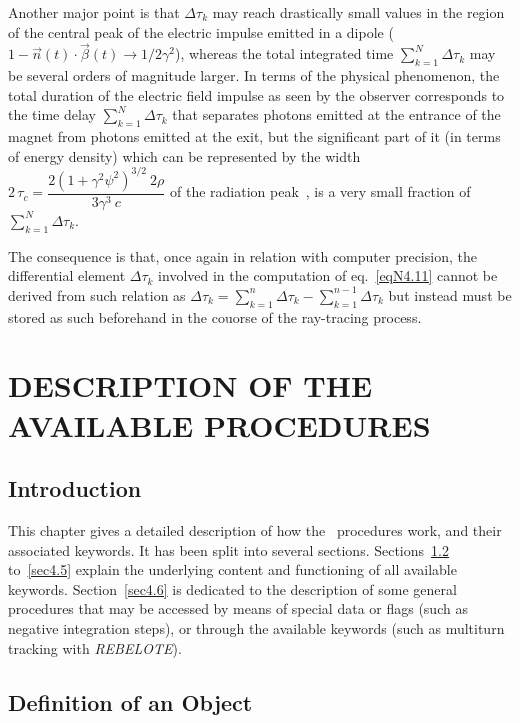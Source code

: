 \noindent Another major point is that  $ \Delta \tau_k$ may reach drastically small values 
in the region of the central peak of the electric impulse emitted in 
a dipole ($1 - \vec{n}(t) \cdot \vec{\beta} (t) \to
1/2\gamma^2$), whereas the total integrated time $\sum_{k=1}^{N} \Delta \tau_k$ may be several
orders of magnitude larger. In terms of the physical phenomenon, the total duration of the electric 
field impulse as seen by the observer corresponds to the time delay $ \sum_{k=1}^{N} \Delta \tau_k$
that separates photons emitted at the
entrance of the magnet from photons emitted at the exit, but the significant  part of it
(in terms of energy density) which can be represented by the width 
$ 2\, \tau_c = \dfrac{2(1 +\gamma^2\psi^2)^{3/2}~2\rho }{ 3\gamma^3~c}$ of the  
radiation peak~\cite{after}, is a very small fraction of $ \sum_{k=1}^{N} \Delta \tau_k$.

\noindent The consequence is that, once again in relation with computer precision, the
differential  element $\Delta \tau_k$ involved in the computation of 
eq.~\ref{eqN4.11} cannot be derived from such relation as 
 $\Delta\tau_k = \sum_{k=1}^{n} \Delta\tau_k - \sum_{k=1}^{n-1} \Delta \tau_k$ 
but instead must be stored as such beforehand in the couorse of the ray-tracing process. 


\clearemptydoublepage

\section{DESCRIPTION OF THE AVAILABLE PROCEDURES} \label{sec4}

\subsection{Introduction} \label{4.1} 


This chapter gives a detailed description of how the \zgou\ 
procedures work, and their associated keywords. It has been 
split into several sections. Sections~\ref{sec4.2} to~\ref{sec4.5} explain the 
underlying content and functioning of all available keywords. 
Section~\ref{sec4.6} is dedicated to the description of some general 
procedures that may be accessed by means of special data or flags 
(such as negative integration steps), or through the available 
keywords (such as multiturn tracking with \textsl{REBELOTE}). 

\subsection{Definition of an Object} \label{sec4.2}

